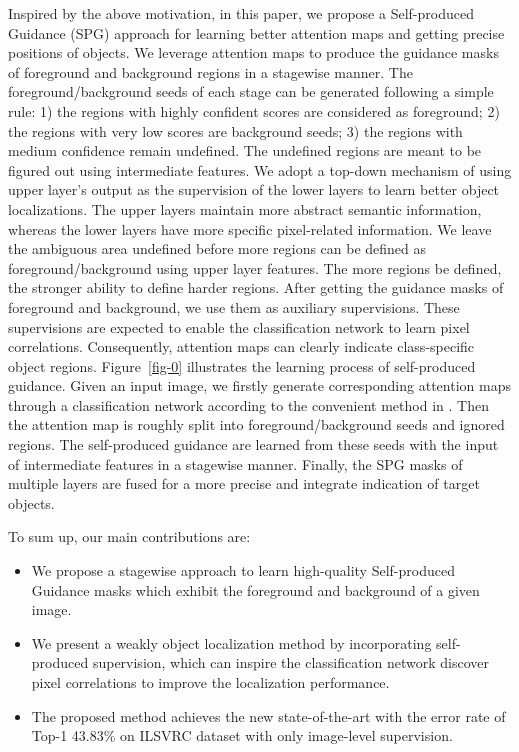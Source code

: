 \documentclass[runningheads]{llncs}
\begin{document}
Inspired by the above motivation, in this paper, we propose a Self-produced Guidance (SPG) approach for learning better attention maps and getting precise positions of objects.
We leverage attention maps to produce the guidance masks of foreground and background regions in a stagewise manner.
The foreground/background seeds of each stage can be generated following a simple rule:
1) the regions with highly confident scores are considered as foreground; 
2) the regions with very low scores are background seeds; 
3) the regions with medium confidence remain undefined.
The undefined regions are meant to be figured out using intermediate features.
We adopt a top-down mechanism of using upper layer's output as the supervision of the lower layers to learn better object localizations.
The upper layers maintain more abstract semantic information, whereas the lower layers have more specific pixel-related information.
We leave the ambiguous area undefined before more regions can be defined as foreground/background using upper layer features.
The more regions be defined, the stronger ability to define harder regions.
After getting the guidance masks of foreground and background, we use them as auxiliary supervisions. 
These supervisions are expected to enable the classification network to learn pixel correlations.
Consequently, attention maps can clearly indicate class-specific object regions.
Figure~\ref{fig-0} illustrates the learning process of self-produced guidance.
Given an input image, we firstly generate corresponding attention maps through a classification network according to the convenient method in \cite{zhang2018adversarial}.
Then the attention map is roughly split into foreground/background seeds and ignored regions.
The self-produced guidance are learned from these seeds with the input of intermediate features in a stagewise manner.
Finally, the SPG masks of multiple layers are fused for a more precise and integrate indication of target objects.

To sum up, our main contributions are:
\begin{itemize}
\item We propose a stagewise approach to learn high-quality Self-produced Guidance masks which exhibit the foreground and background of a given image.
\item We present a weakly object localization method by incorporating self-produced supervision, which can inspire the classification network discover pixel correlations to improve the localization performance.
\item The proposed method achieves the new state-of-the-art with the error rate of Top-1 43.83\% on ILSVRC dataset with only image-level supervision.
\end{itemize}
\end{document}
